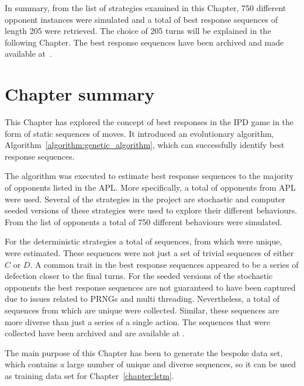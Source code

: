 In summary, from the list of \numberofstrategiesbestsequences strategies
examined in this Chapter, 750 different opponent instances were simulated and a
total of \totalsequences best response sequences of length 205 were retrieved. The choice of
205 turns will be explained in the following Chapter. The best response sequences have
been archived and made available at~\cite{Glynatsi2020_sequences}.

\section{Chapter summary}

This Chapter has explored the concept of best responses in the IPD game in the
form of static sequences of moves. It introduced an evolutionary algorithm,
Algorithm~\ref{algorithm:genetic_algorithm}, which can successfully identify
best response sequences.

The algorithm was executed to estimate best response sequences to the majority
of opponents listed in the APL. More specifically, a total of
\numberofstrategiesbestsequences opponents from APL were used. Several of the
strategies in the project are stochastic and computer seeded versions of these
strategies were used to explore their different behaviours. From the list of
\numberofstrategiesbestsequences opponents a total of 750 different behaviours
were simulated.

For the \deterministicstrategies deterministic strategies a total of \deterministicsequences
sequences, from which \deterministicuniquesequences were unique, were estimated. These sequences were not
just a set of trivial sequences of either \(C\) or \(D\). A common trait in the
best response sequences appeared to be a series of defection closer to the final
turns. For the seeded versions of the \stochasticstrategies stochastic opponents
the best response sequences are not guaranteed to have been captured due to issues related to PRNGs and multi threading.
Nevertheless, a total of \stochasticsequences sequences from which \stochasticuniquesequences are unique were
collected. Similar, these sequences are more diverse than just a series of
a single action. The \totalsequences sequences that were collected have been
archived and are available at \cite{Glynatsi2020_sequences}.

The main purpose of this Chapter has been to generate the bespoke data set,
which contains a large number of unique and diverse sequences,
so it can be used as training data set for Chapter~\ref{chapter:lstm}.
